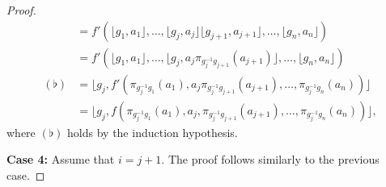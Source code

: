 \documentclass[11pt]{amsart}
\numberwithin{equation}{section}
\theoremstyle{definition}
\theoremstyle{remark}
\begin{document}
\begin{proof}
\begin{align*}
        &= f'(\lfloor g_1, a_1 \rfloor, \ldots, \lfloor g_j, a_j \rfloor \lfloor g_{j+1}, a_{j+1} \rfloor, \ldots, \lfloor g_n, a_n \rfloor) \\
        &= f'(\lfloor g_1, a_1 \rfloor, \ldots,
            \lfloor g_j, a_{j}\pi_{g_j^{-1}g_{j+1}}(a_{j+1})\rfloor,
            \ldots, \lfloor g_n, a_n \rfloor) \\
        (\flat)&= \lfloor 
            g_j,
            f'(
            \pi_{g_j^{-1}g_1}(a_1), a_j \pi_{g_j^{-1}g_{j+1}}(a_{j+1}),
            \ldots,\pi_{g_j^{-1}g_n}(a_n)
            )
            \rfloor \\
        &= \lfloor 
            g_j,
            f(
            \pi_{g_j^{-1}g_1}(a_1), a_j, \pi_{g_j^{-1}g_{j+1}}(a_{j+1}),
            \ldots,\pi_{g_j^{-1}g_n}(a_n)
            )
            \rfloor,
    \end{align*}
    where \((\flat)\) holds by the induction hypothesis.

    \textbf{Case 4:} Assume that \(i = j+1\). The proof follows similarly to the previous case.
\end{proof}
\end{document}
